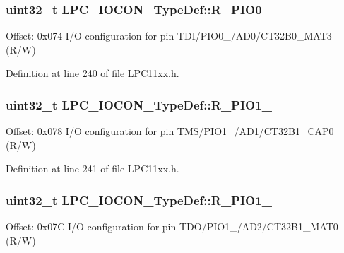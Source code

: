\subsubsection[{\texorpdfstring{R\+\_\+\+P\+I\+O0\+\_\+11}{R_PIO0_11}}]{ uint32\+\_\+t L\+P\+C\+\_\+\+I\+O\+C\+O\+N\+\_\+\+Type\+Def\+::\+R\+\_\+\+P\+I\+O0\+\_}\hypertarget{group___l_p_c11xx___definitions_ga217ef0df39e9b59c6633cdaf10460939}{}\label{group___l_p_c11xx___definitions_ga217ef0df39e9b59c6633cdaf10460939}
Offset\+: 0x074 I/O configuration for pin T\+D\+I/\+P\+I\+O0\+\_/\+A\+D0/\+C\+T32\+B0\+\_\+\+M\+A\+T3 (R/W) 

Definition at line 240 of file L\+P\+C11xx.\+h.

\subsubsection[{\texorpdfstring{R\+\_\+\+P\+I\+O1\+\_\+0}{R_PIO1_0}}]{ uint32\+\_\+t L\+P\+C\+\_\+\+I\+O\+C\+O\+N\+\_\+\+Type\+Def\+::\+R\+\_\+\+P\+I\+O1\+\_}\hypertarget{group___l_p_c11xx___definitions_gafa554ece26b1cedbb06e8def15bec47e}{}\label{group___l_p_c11xx___definitions_gafa554ece26b1cedbb06e8def15bec47e}
Offset\+: 0x078 I/O configuration for pin T\+M\+S/\+P\+I\+O1\+\_/\+A\+D1/\+C\+T32\+B1\+\_\+\+C\+A\+P0 (R/W) 

Definition at line 241 of file L\+P\+C11xx.\+h.

\subsubsection[{\texorpdfstring{R\+\_\+\+P\+I\+O1\+\_\+1}{R_PIO1_1}}]{ uint32\+\_\+t L\+P\+C\+\_\+\+I\+O\+C\+O\+N\+\_\+\+Type\+Def\+::\+R\+\_\+\+P\+I\+O1\+\_}\hypertarget{group___l_p_c11xx___definitions_gad6f021c3546227736e430948dc05e2c3}{}\label{group___l_p_c11xx___definitions_gad6f021c3546227736e430948dc05e2c3}
Offset\+: 0x07C I/O configuration for pin T\+D\+O/\+P\+I\+O1\+\_/\+A\+D2/\+C\+T32\+B1\+\_\+\+M\+A\+T0 (R/W) 

